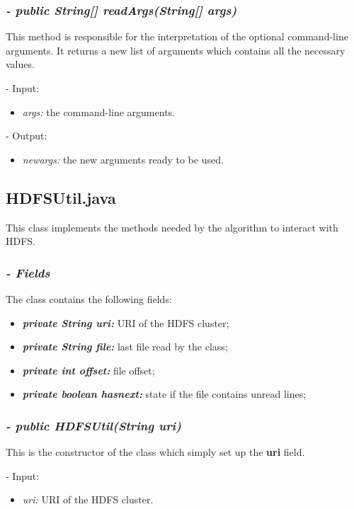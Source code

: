 \documentclass[]{report}
\begin{document}
	\subsubsection*{\textit{\textbf{-} public String[] readArgs(String[] args)}}   	
	This method is responsible for the interpretation of the optional command-line arguments. It returns a new list of arguments which contains all the necessary values.  
	\begin{description}
		\item - Input:
		\begin{itemize}
			\item \textit{args:} the command-line arguments.
		\end{itemize}
	\end{description}
	\begin{description}
		\item - Output:
		\begin{itemize}
			\item \textit{newargs:} the new arguments ready to be used. 
		\end{itemize}
	\end{description}

	
	\subsection*{HDFSUtil.java}
	This class implements the methods needed by the algorithm to interact with HDFS.
	\subsubsection*{\textit{\textbf{-} Fields}} 
	The class contains the following fields:
	\begin{itemize}
		\item \textit{\textbf{private String uri:}} URI of the HDFS cluster;
		\item \textit{\textbf{private String file:}} last file read by the class;
		\item \textit{\textbf{private int offset:}} file offset; 
		\item \textit{\textbf{private boolean hasnext:}} state if the file contains unread lines;		
	\end{itemize}

	\subsubsection*{\textit{\textbf{-} public HDFSUtil(String uri)}}   	
	This is the constructor of the class which simply set up the \textbf{uri} field.   
	\begin{description}
		\item - Input:
		\begin{itemize}
			\item \textit{uri:} URI of the HDFS cluster.
		\end{itemize}
	\end{description}
\end{document}

